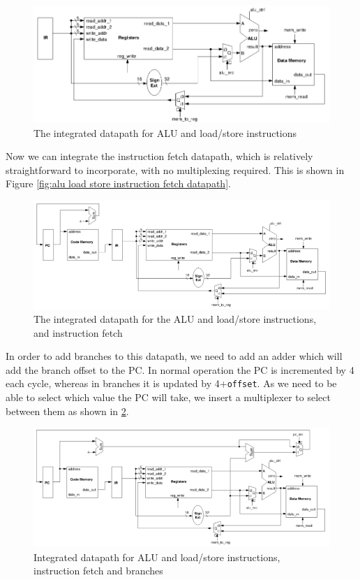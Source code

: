 \documentclass{article}
\begin{document}
	\begin{figure}
		\centering
		\includegraphics[width=\textwidth]{alu_load_store_datapath}
		\caption{The integrated datapath for ALU and load/store instructions}
		\label{fig:alu load store datapath}
	\end{figure}		
	
	Now we can integrate the instruction fetch datapath, which is relatively straightforward to incorporate, with no multiplexing required. This is shown in Figure \ref{fig:alu load store instruction fetch datapath}.
	
	\begin{figure}[ht]
		\centering
		\includegraphics[width=\textwidth]{alu_load_store_instruction_fetch_datapath}
		\caption{The integrated datapath for the ALU and load/store instructions, and instruction fetch}
	\end{figure}
	
	In order to add branches to this datapath, we need to add an adder which will add the branch offset to the PC. In normal operation the PC is incremented by 4 each cycle, whereas in branches it is updated by 4+\texttt{offset}. As we need to be able to select which value the PC will take, we insert a multiplexer to select between them as shown in \ref{fig:integrated branch datapath}.
	
	\begin{figure}[ht]
		\centering
		\includegraphics[width=\textwidth]{integrated_branch_datapath}
		\caption{Integrated datapath for ALU and load/store instructions, instruction fetch and branches}
		\label{fig:integrated branch datapath}
	\end{figure}
	
\end{document}
